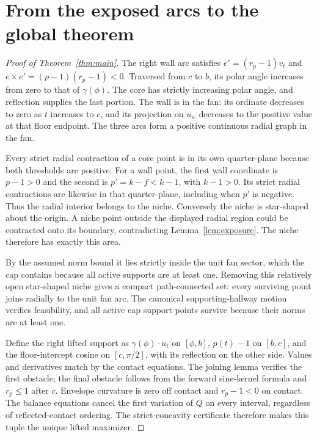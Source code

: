 \documentclass[11pt]{article}
\begin{document}
\section{From the exposed arcs to the global theorem}
\begin{proof}[Proof of Theorem~\ref{thm:main}]
The right wall arc satisfies $e'=(r_p-1)v_t$ and $e\times e'=(p-1)(r_p-1)<0$. Traversed from $c$ to $b$, its polar angle increases from zero to that of $\gamma(\phi)$. The core has strictly increasing polar angle, and reflection supplies the last portion. The wall is in the fan: its ordinate decreases to zero as $t$ increases to $c$, and its projection on $u_w$ decreases to the positive value at that floor endpoint. The three arcs form a positive continuous radial graph in the fan.

Every strict radial contraction of a core point is in its own quarter-plane because both thresholds are positive. For a wall point, the first wall coordinate is $p-1>0$ and the second is $p'=k-f<k-1$, with $k-1>0$. Its strict radial contractions are likewise in that quarter-plane, including when $p'$ is negative. Thus the radial interior belongs to the niche. Conversely the niche is star-shaped about the origin. A niche point outside the displayed radial region could be contracted onto its boundary, contradicting Lemma~\ref{lem:exposure}. The niche therefore has exactly this area.

By the assumed norm bound it lies strictly inside the unit fan sector, which the cap contains because all active supports are at least one. Removing this relatively open star-shaped niche gives a compact path-connected set: every surviving point joins radially to the unit fan arc. The canonical supporting-hallway motion verifies feasibility, and all active cap support points survive because their norms are at least one.

Define the right lifted support as $\gamma(\phi)\cdot u_t$ on $[\phi,b]$, $p(t)-1$ on $[b,c]$, and the floor-intercept cosine on $[c,\pi/2]$, with its reflection on the other side. Values and derivatives match by the contact equations. The joining lemma verifies the first obstacle; the final obstacle follows from the forward sine-kernel formula and $r_p\le1$ after $c$. Envelope curvature is zero off contact and $r_p-1<0$ on contact. The balance equations cancel the first variation of $Q$ on every interval, regardless of reflected-contact ordering. The strict-concavity certificate therefore makes this tuple the unique lifted maximizer.


\end{proof}
\end{document}
